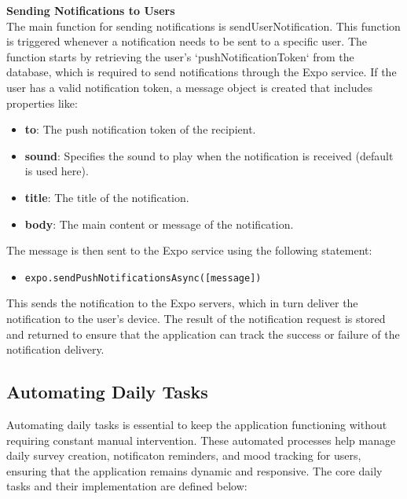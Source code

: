 \noindent \textbf{Sending Notifications to Users} \\
The main function for sending notifications is sendUserNotification. This function is triggered whenever a notification needs to be sent to a specific user. The function starts by retrieving the user's `pushNotificationToken` from the database, which is required to send notifications through the Expo service. If the user has a valid notification token, a message object is created that includes properties like:
\begin{itemize}
    \item \textbf{to}: The push notification token of the recipient.
    \item \textbf{sound}: Specifies the sound to play when the notification is received (default is used here).
    \item \textbf{title}: The title of the notification.
    \item \textbf{body}: The main content or message of the notification.
\end{itemize}
The message is then sent to the Expo service using the following statement:
\begin{itemize}
    \item \texttt{expo.sendPushNotificationsAsync([message])}
\end{itemize}
This sends the notification to the Expo servers, which in turn deliver the notification to the user's device.
The result of the notification request is stored and returned to ensure that the application can track the success or failure of the notification delivery.

\subsection{Automating Daily Tasks}

Automating daily tasks is essential to keep the application functioning without requiring constant manual intervention. These automated processes help manage daily survey creation, notificaton reminders, and mood tracking for users, ensuring that the application remains dynamic and responsive. The core daily tasks and their implementation are defined below:

